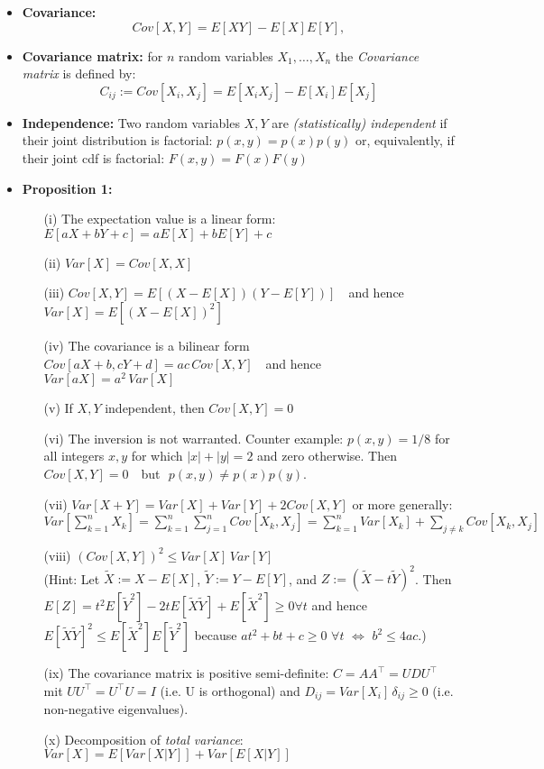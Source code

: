 \begin{itemize}
\item {\bf Covariance:} 
$$
Cov[X,Y]= E[XY]-E[X]E[Y], 
$$
\item {\bf Covariance matrix:} for  $n$ random variables $X_1, \dots , X_n$ the {\it Covariance matrix} is defined by:
$$
 C_{ij} := Cov[X_i, X_j] = E[X_i X_j] - E[X_i] E[X_j]
$$
\item {\bf Independence:} 
Two random variables $X,Y$ are {\it (statistically) independent} if their joint distribution is factorial: $p(x,y)= p(x) p(y)$ or, equivalently, if their joint cdf is factorial: $F(x,y)=F(x)F(y)$
\item {\bf Proposition 1:} 
\begin{itemize}
\item[(i)] The expectation value is a linear form: $E[aX +bY+c]= a E[X]+bE[Y]+c$
\item[(ii)] $Var[X] = Cov[X,X]$
\item[(iii)] $Cov[X, Y] = E[(X - E[X])(Y-E[Y])]$ \,\, and hence \,\, $Var[X] = E[(X - E[X])^2]$
\item[(iv)] The covariance is a bilinear form $Cov[aX+b, cY+d]=ac \, Cov[X, Y] $ \,\, and hence \,\, $Var[aX] = a^2\, Var[X]$
\item[(v)] If  $X,Y$ independent, then $Cov[X,Y] = 0$
\item[(vi)] The inversion is not warranted. Counter example: $p(x,y) = 1/8$ for all integers $x,y$ for which $|x| + |y| =2 $ and zero otherwise. Then\,\,  $Cov[X,Y] = 0$ \,\, but\,\, $p(x,y)\ne p(x) p(y)$.
\item[(vii)] $Var[X+Y] =  Var[X] + Var[Y] + 2 Cov[X,Y]$ or more generally:\\[.2cm] $Var\left[\sum_{k=1}^n X_k \right] = \sum_{k=1}^n \sum_{j=1}^n Cov[X_k, X_j] = \sum_{k=1}^n Var[X_k] + \sum_{j\ne k} Cov[X_k, X_j] $
\item[(viii)] $(Cov[X, Y])^2\le Var[X] \, Var[Y]$ \\(Hint: Let $\tilde X:=X-E[X]$, $\tilde Y:=Y-E[Y]$, and $Z:= (\tilde X-t\tilde Y)^2$. Then $E[Z]=t^2 E[\tilde Y^2]-2tE[\tilde X\tilde Y]+E[\tilde X^2] \ge 0 \forall t$ and hence $E[\tilde X\tilde Y]^2 \le E[\tilde X^2]E[\tilde Y^2]$ because $at^2 + bt+c \ge 0\,\, \forall t \,\, \Leftrightarrow \,\, b^2\le 4ac$.) 
\item[(ix)] The covariance matrix is positive semi-definite: $C=AA^\top=UDU^\top$ mit $UU^\top=U^\top U=I$ (i.e. U is orthogonal) and $D_{ij}=Var[X_i] \, \delta_{ij} \ge 0$ (i.e. non-negative eigenvalues).
\item[(x)] Decomposition of {\it total variance}: $Var[X] = E[Var[X|Y]] + Var[E[X|Y]]$

\end{itemize}
\end{itemize}

